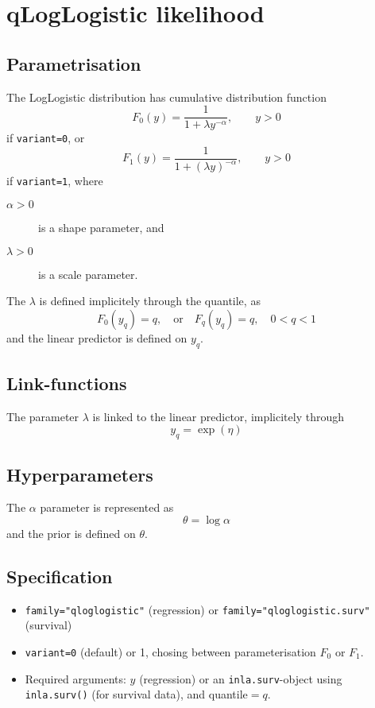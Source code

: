 \documentclass[a4paper,11pt]{article}
\begin{document}
\section*{qLogLogistic likelihood}

\subsection*{Parametrisation}

The LogLogistic distribution has cumulative distribution function
\begin{displaymath}
    F_0(y) = \frac{1}{1 + \lambda y^{-\alpha}}, \qquad y > 0
\end{displaymath}
if \texttt{variant=0}, or
\begin{displaymath}
    F_1(y) = \frac{1}{1 + (\lambda y)^{-\alpha}}, \qquad y > 0
\end{displaymath}
if \texttt{variant=1}, where
\begin{description}
\item[$\alpha > 0$] is a shape parameter, and
\item[$\lambda > 0$] is a scale parameter.
\end{description}
The $\lambda$ is defined implicitely through the quantile, as
\begin{displaymath}
    F_0(y_q) = q, \quad\text{or}\quad
    F_q(y_q) = q, \quad 0<q<1
\end{displaymath}
and the linear predictor is defined on $y_q$.

\subsection*{Link-functions}

The parameter $\lambda$ is linked to the linear predictor, implicitely through
\[
    y_q = \exp(\eta)
\]

\subsection*{Hyperparameters}

The $\alpha$ parameter is represented as
\[
    \theta = \log\alpha
\]
and the prior is defined on $\theta$.

\subsection*{Specification}

\begin{itemize}
\item \texttt{family="qloglogistic"} (regression) or
    \texttt{family="qloglogistic.surv"} (survival)
\item \texttt{variant=0} (default) or 1, chosing between
    parameterisation $F_0$ or $F_1$.
\item Required arguments: $y$ (regression) or an
    \texttt{inla.surv}-object using \texttt{inla.surv()} (for survival
    data), and quantile$=q$.
\end{itemize}
\end{document}

